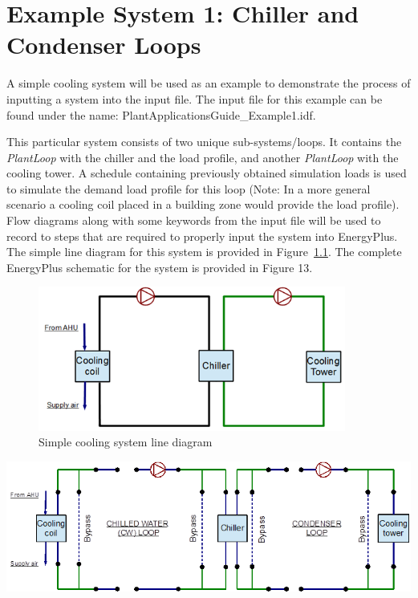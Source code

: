 \chapter{Example System 1: Chiller and Condenser Loops}\label{example-system-1-chiller-and-condenser-loops}

A simple cooling system will be used as an example to demonstrate the process of inputting a system into the input file. The input file for this example can be found under the name: PlantApplicationsGuide\_Example1.idf.

This particular system consists of two unique sub-systems/loops. It contains the \emph{PlantLoop} with the chiller and the load profile, and another \emph{PlantLoop} with the cooling tower. A schedule containing previously obtained simulation loads is used to simulate the demand load profile for this loop (Note: In a more general scenario a cooling coil placed in a building zone would provide the load profile). Flow diagrams along with some keywords from the input file will be used to record to steps that are required to properly input the system into EnergyPlus. The simple line diagram for this system is provided in Figure~\ref{fig:simple-cooling-system-line-diagram}. The complete EnergyPlus schematic for the system is provided in Figure 13.

\begin{figure}[hbtp] %
\centering
\includegraphics[width=0.9\textwidth, height=0.9\textheight, keepaspectratio=true]{media/image012.png}
\caption{Simple cooling system line diagram \protect \label{fig:simple-cooling-system-line-diagram}}
\end{figure}

\textbf{\includegraphics{media/image013.png}}

